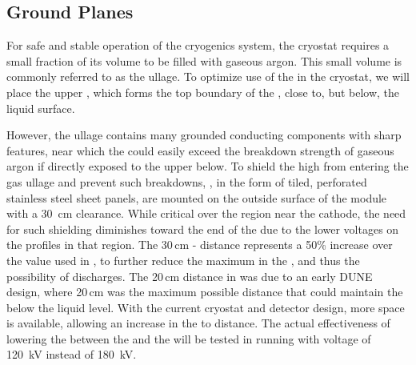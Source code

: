 


\subsection{Ground Planes}
\label{sec:fdsp-hv-des-fc-gp}

For safe and stable operation of the \lar cryogenics system, the cryostat requires a small fraction of its volume to be filled with gaseous argon. This small volume is commonly referred to as the ullage. To optimize use of the \lar in the cryostat, we will place the upper , which forms the top boundary of the , close to, but below, the liquid surface.

However, the ullage contains many grounded %
conducting components with sharp features, near which the \efield could easily exceed the breakdown strength of gaseous argon if directly exposed to the upper  below. To shield the high \efield from entering the gas ullage and prevent such breakdowns, %
, %
in the form of tiled, perforated stainless steel sheet panels, are mounted on the outside surface of the 
 module with a \SI{30}{cm} clearance. While critical over the region near the cathode, the need for such shielding diminishes toward the  end of the  due to the lower voltages on the  profiles in that region. 
The 30\,cm - distance represents a 50\% increase over the value used in , to further reduce the maximum \efield in the , and thus the possibility of discharges. The 20\,cm distance in  was due to an early DUNE design, where 20\,cm was the maximum possible distance that could maintain the  below the liquid level. With the current cryostat and detector design, more space is available, allowing an increase in the  to  distance. The actual effectiveness of lowering the \efield between the  and the  will be tested in  running with  voltage of \SI{120}{\kV} instead of \SI{180}{\kV}.
 


